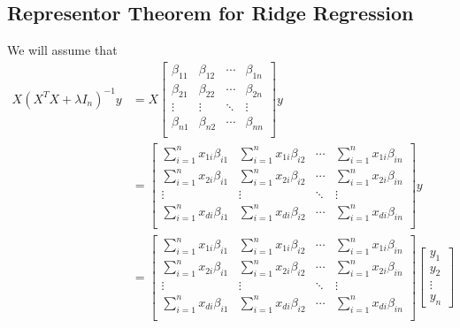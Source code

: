 \subsection{Representor Theorem for Ridge Regression}
\label{appendix:representor-ridge}
We will assume that
\begin{equation*}
\begin{aligned}
    X(X^TX + \lambda I_n)^{-1}y &= X\begin{bmatrix}
        \beta_{11} & \beta_{12} & \cdots & \beta_{1n} \\
        \beta_{21} & \beta_{22} & \cdots & \beta_{2n} \\
        \vdots & \vdots & \ddots & \vdots \\
        \beta_{n1} & \beta_{n2} & \cdots & \beta_{nn} \\
    \end{bmatrix}y \\
    &= \begin{bmatrix}
        \sum^n_{i=1}x_{1i}\beta_{i1} & \sum^n_{i=1}x_{1i}\beta_{i2} & \cdots & \sum^n_{i=1}x_{1i}\beta_{in} \\
        \sum^n_{i=1}x_{2i}\beta_{i1} & \sum^n_{i=1}x_{2i}\beta_{i2} & \cdots & \sum^n_{i=1}x_{2i}\beta_{in} \\
        \vdots & \vdots & \ddots & \vdots \\
        \sum^n_{i=1}x_{di}\beta_{i1} & \sum^n_{i=1}x_{di}\beta_{i2} & \cdots & \sum^n_{i=1}x_{di}\beta_{in} \\
    \end{bmatrix}y \\
    &= \begin{bmatrix}
        \sum^n_{i=1}x_{1i}\beta_{i1} & \sum^n_{i=1}x_{1i}\beta_{i2} & \cdots & \sum^n_{i=1}x_{1i}\beta_{in} \\
        \sum^n_{i=1}x_{2i}\beta_{i1} & \sum^n_{i=1}x_{2i}\beta_{i2} & \cdots & \sum^n_{i=1}x_{2i}\beta_{in} \\
        \vdots & \vdots & \ddots & \vdots \\
        \sum^n_{i=1}x_{di}\beta_{i1} & \sum^n_{i=1}x_{di}\beta_{i2} & \cdots & \sum^n_{i=1}x_{di}\beta_{in} \\
    \end{bmatrix}
    \begin{bmatrix}
        y_1 \\ y_2 \\ \vdots \\ y_n
    \end{bmatrix} \\

\end{aligned}
\end{equation*}
